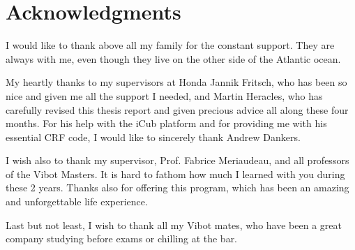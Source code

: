 \tableofcontents

\listoffigures

\chapter*{Acknowledgments}
         {\protect{}}

I would like to thank above all my family for the constant support. They are always with me, even though they live on the other side of the Atlantic ocean. 

My heartly thanks to my supervisors at Honda Jannik Fritsch, who has been so nice and given me all the support I needed, and Martin Heracles, who has carefully revised this thesis report and given precious advice all along these four months. For his help with the iCub platform and for providing me with his essential CRF code, I would like to sincerely thank Andrew Dankers.

I wish also to thank my supervisor, Prof. Fabrice Meriaudeau, and all professors of the Vibot Masters. It is hard to fathom how much I learned with you during these 2 years. Thanks also for offering this program, which has been an amazing and unforgettable life experience.

Last but not least, I wish to thank all my Vibot mates, who have been a great company studying before exams or chilling at the bar.   

\pagestyle{fancy}

